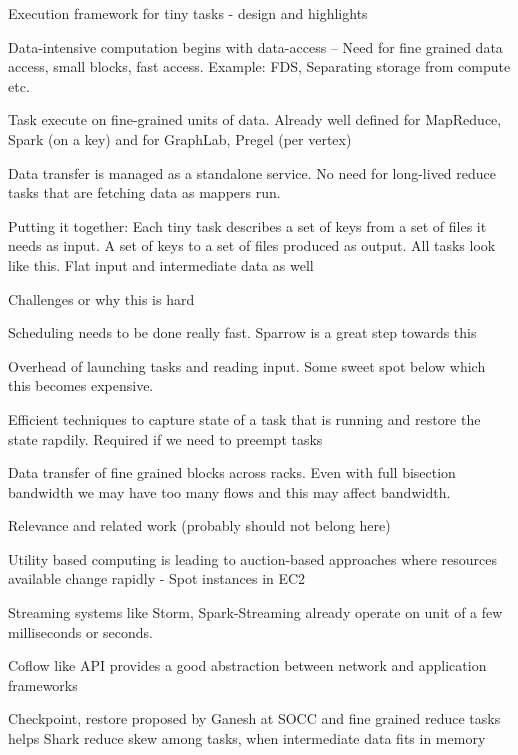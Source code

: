 Execution framework for tiny tasks - design and highlights
\begin{myitemize}
  \item Data-intensive computation begins with data-access -- Need for fine grained data access, small blocks, fast access. Example: FDS, Separating storage from compute etc.
  \item Task execute on fine-grained units of data. Already well defined for MapReduce, Spark (on a key) and for GraphLab, Pregel (per vertex)
  \item Data transfer is managed as a standalone service. No need for long-lived reduce tasks that are fetching data as mappers run. 
  \item Putting it together: Each tiny task describes a set of keys from a set of files it needs as input. A set of keys to a set of files produced as output. All tasks look like this. Flat input and intermediate data as well
\end{myitemize}

Challenges or why this is hard
\begin{myitemize}
  \item Scheduling needs to be done really fast. Sparrow is a great step towards this
  \item Overhead of launching tasks and reading input. Some sweet spot below which this becomes expensive.
  \item Efficient techniques to capture state of a task that is running and restore the state rapdily. Required if we need to preempt tasks
  \item Data transfer of fine grained blocks across racks. Even with full bisection bandwidth we may have too many flows and this may affect bandwidth.
\end{myitemize}

Relevance and related work (probably should not belong here)
\begin{myitemize}
  \item Utility based computing is leading to auction-based approaches where resources available change rapidly - Spot instances in EC2
  \item Streaming systems like Storm, Spark-Streaming already operate on unit of a few milliseconds or seconds.
  \item Coflow like API provides a good abstraction between network and application frameworks
  \item Checkpoint, restore proposed by Ganesh at SOCC and fine grained reduce tasks helps Shark reduce skew among tasks, when intermediate data fits in memory
\end{myitemize}
